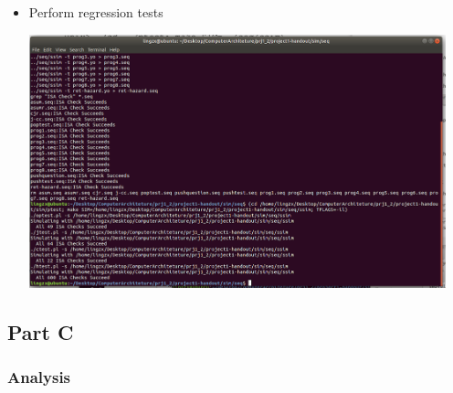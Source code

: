 \documentclass{article}
\begin{document}
\begin{itemize}
\item Perform regression tests

\includegraphics[width=0.95\textwidth]{regressionn.png}

\end{itemize}
\subsection{Part C}

\subsubsection{Analysis}
\end{document}

